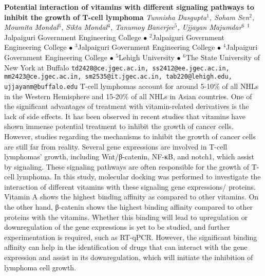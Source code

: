 
    \begin{conf-abstract}[]
        {\textbf{Potential interaction of vitamins with different signaling pathways to inhibit the growth of T-cell lymphoma}}
        {\textit{Tunnisha Dasgupta$^{1}$, Soham Sen$^{2}$, Moumita Mondal$^{3}$, Sikta Mondal$^{4}$, Tanumoy Banerjee$^{5}$, Ujjayan Majumdar$^{6}$}}
        {$^{1}$Jalpaiguri Government Engineering College $\bullet$ $^{2}$Jalpaiguri Government Engineering College $\bullet$ $^{3}$Jalpaiguri Government Engineering College $\bullet$ $^{4}$Jalpaiguri Government Engineering College $\bullet$ $^{5}$Lehigh University $\bullet$ $^{6}$The State University of New York at Buffalo}
        {\texttt{td2428@ce.jgec.ac.in, ss2412@ee.jgec.ac.in, mm2423@ce.jgec.ac.in, sm2535@it.jgec.ac.in, tab220@lehigh.edu, ujjayanm@buffalo.edu}}
        {           T-cell lymphomas account for around 5-10\% of all NHLs in the Western Hemisphere and 15-20\% of all NHLs in Asian countries. One of the significant advantages of treatment with vitamin-related derivatives is the lack of side effects. It has been observed in recent studies that vitamins have shown immense potential treatment to inhibit the growth of cancer cells. However, studies regarding the mechanisms to inhibit the growth of cancer cells are still far from reality. Several gene expressions are involved in T-cell lymphomas' growth, including Wnt/β-catenin, NF-κB, and notch1, which assist by signaling. These signaling pathways are often responsible for the growth of T-cell lymphoma. In this study, molecular docking was performed to investigate the interaction of different vitamins with these signaling gene expressions/ proteins. Vitamin A shows the highest binding affinity as compared to other vitamins. On the other hand, β-catenin shows the highest binding affinity compared to other proteins with the vitamins. Whether this binding will lead to upregulation or downregulation of the gene expressions is yet to be studied, and further experimentation is required, such as RT-qPCR. However, the significant binding affinity can help in the identification of drugs that can interact with the gene expression and assist in its downregulation, which will initiate the inhibition of lymphoma cell growth. }
    \end{conf-abstract}
        
